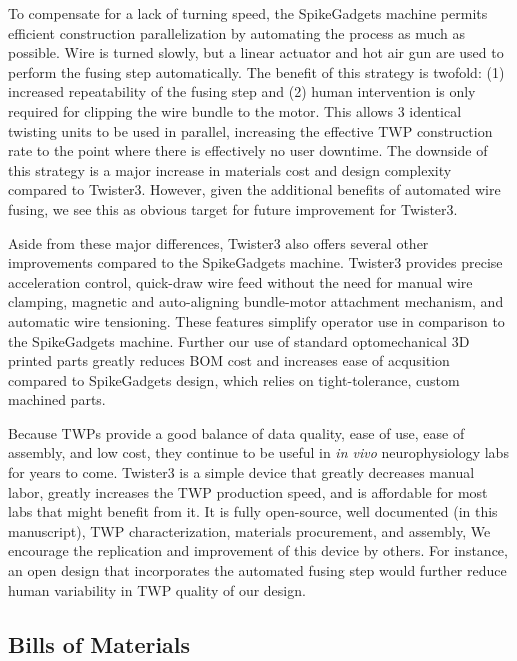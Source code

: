 \documentclass[11pt,a4paper]{article}
\begin{document}
To compensate for a lack of turning speed, the SpikeGadgets machine permits
efficient construction parallelization by automating the process as much as
possible. Wire is turned slowly, but a linear actuator and hot air gun are used
to perform the fusing step automatically. The benefit of this strategy is
twofold: (1) increased repeatability of the fusing step and (2) human
intervention is only required for clipping the wire bundle to the motor. This
allows 3 identical twisting units to be used in parallel, increasing the
effective TWP construction rate to the point where there is effectively no user
downtime. The downside of this strategy is a major increase in materials cost
and design complexity compared to Twister3. However, given the additional
benefits of automated wire fusing, we see this as obvious target for future
improvement for Twister3.

Aside from these major differences, Twister3 also offers several other
improvements compared to the SpikeGadgets machine. Twister3 provides precise
acceleration control, quick-draw wire feed without the need for manual wire
clamping,  magnetic and auto-aligning bundle-motor attachment mechanism, and
automatic wire tensioning. These features simplify operator use in comparison
to the SpikeGadgets machine. Further our use of standard optomechanical 3D
printed parts greatly reduces BOM cost and increases ease of acqusition
compared to SpikeGadgets design, which relies on tight-tolerance, custom
machined parts.

Because TWPs provide a good balance of data quality, ease of use, ease of
assembly, and low cost, they continue to be useful in \textit{in vivo}
neurophysiology labs for years to come. Twister3 is a simple device that
greatly decreases manual labor, greatly increases the TWP production speed, and
is affordable for most labs that might benefit from it. It is fully
open-source, well documented (in this manuscript), TWP characterization,
materials procurement, and assembly, We encourage the replication and
improvement of this device by others. For instance, an open design that
incorporates the automated fusing step would further reduce human variability
in TWP quality of our design.

\medskip




\newpage

\begin{appendices}

\section{Bills of Materials}





\end{appendices}
\end{document}
